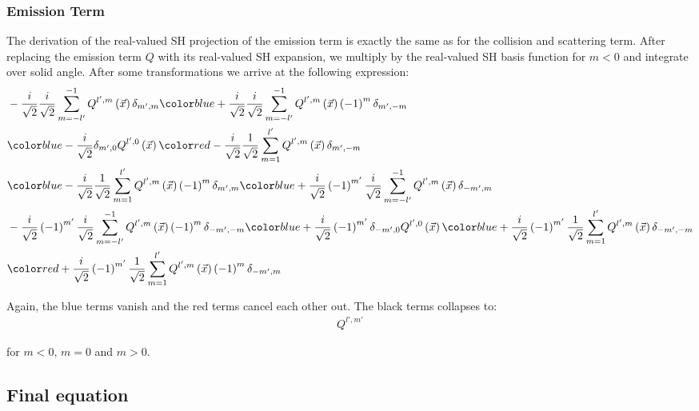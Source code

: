 \documentclass{egpubl}
\makeatletter
\def\mathcolor#1#{\@mathcolor{#1}}
\def\@mathcolor#1#2#3{%
  \protect\leavevmode
  \begingroup\color#1{#2}#3\endgroup
}
\makeatother
\begin{document}
\subsubsection{Emission Term}

The derivation of the real-valued SH projection of the emission term is exactly the same as for the collision and scattering term.
After replacing the emission term $Q$ with its real-valued SH expansion, we multiply by the real-valued SH basis function for $m<0$ and integrate over solid angle. After some transformations we arrive at the following expression:
\begin{align*}
&
-\frac{i}{\sqrt{2}}\frac{i}{\sqrt{2}}\sum_{m=-l'}^{-1}{Q^{{l',m}}\left (\vec{x} \right )\delta_{m',m}}
\mathcolor{blue}
{
+\frac{i}{\sqrt{2}}\frac{i}{\sqrt{2}}\sum_{m=-l'}^{-1}{Q^{{l',m}}\left (\vec{x} \right )\left({-1}\right)^{m}\delta_{m',-m}}
}
\\&
\mathcolor{blue}
{
-\frac{i}{\sqrt{2}}\delta_{m',0}Q^{{l',0}}\left (\vec{x} \right )
}
\mathcolor{red}
{
-\frac{i}{\sqrt{2}}\frac{1}{\sqrt{2}}\sum_{m=1}^{l'}{Q^{{l',m}}\left (\vec{x} \right )\delta_{m',-m}}
}
\\&
\mathcolor{blue}
{
-\frac{i}{\sqrt{2}}\frac{1}{\sqrt{2}}\sum_{m=1}^{l'}{Q^{{l',m}}\left (\vec{x} \right )\left({-1}\right)^{m}\delta_{m',m}}
}
\mathcolor{blue}
{
+\frac{i}{\sqrt{2}}\left({-1}\right)^{m'}\frac{i}{\sqrt{2}}\sum_{m=-l'}^{-1}{Q^{{l',m}}\left (\vec{x} \right )\delta_{-m',m}}
}
\\&
-\frac{i}{\sqrt{2}}\left({-1}\right)^{m'}\frac{i}{\sqrt{2}}\sum_{m=-l'}^{-1}{Q^{{l',m}}\left (\vec{x} \right )\left({-1}\right)^{m}\delta_{-m',-m}}
\mathcolor{blue}
{
+\frac{i}{\sqrt{2}}\left({-1}\right)^{m'}\delta_{-m',0}Q^{{l',0}}\left (\vec{x} \right )
}
\mathcolor{blue}
{
+\frac{i}{\sqrt{2}}\left({-1}\right)^{m'}\frac{1}{\sqrt{2}}\sum_{m=1}^{l'}{Q^{{l',m}}\left (\vec{x} \right )\delta_{-m',-m}}
}
\\&
\mathcolor{red}
{
+\frac{i}{\sqrt{2}}\left({-1}\right)^{m'}\frac{1}{\sqrt{2}}\sum_{m=1}^{l'}{Q^{{l',m}}\left (\vec{x} \right )\left({-1}\right)^{m}\delta_{-m',m}}
}
\end{align*}

Again, the blue terms vanish and the red terms cancel each other out. The black terms collapses to:
\begin{align*}
Q^{l',m'}
\end{align*}

for $m<0$, $m=0$ and $m>0$.

\subsection{Final equation}
\end{document}
